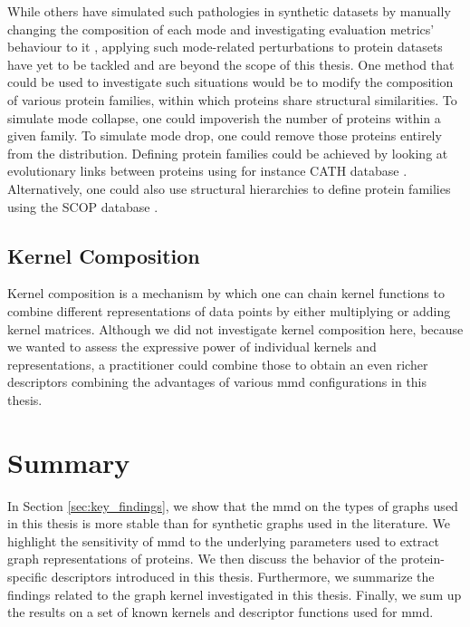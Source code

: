 While others have simulated such pathologies in synthetic datasets by manually
changing the composition of each mode and investigating evaluation metrics'
behaviour to it \citep{thompson2022evaluation}, applying such mode-related
perturbations to protein datasets have yet to be tackled and are beyond the
scope of this thesis. One method that could be used to investigate such
situations would be to modify the composition of various protein families,
within which proteins share structural similarities. To simulate mode collapse,
one could impoverish the number of proteins within a given family. To simulate
mode drop, one could remove those proteins entirely from the distribution.
Defining protein families could be achieved by looking at evolutionary links
between proteins using for instance CATH database \citep{orengo1997cath}.
Alternatively, one could also use structural hierarchies to define protein
families using the SCOP database \citep{murzin1995scop}.

\subsection{Kernel Composition}

Kernel composition is a mechanism by which one can chain kernel functions to
combine different representations of data points by either multiplying or adding
kernel matrices. Although we did not investigate kernel composition here,
because we wanted to assess the expressive power of individual kernels and
representations, a practitioner could combine those to obtain an even richer
descriptors combining the advantages of various \acrshort{mmd} configurations in this
thesis.

\section{Summary}


In Section \ref{sec:key_findings}, we show that the \acrshort{mmd} on the types of graphs used in this
thesis is more stable than for synthetic graphs used in the literature. We
highlight the sensitivity of \acrshort{mmd} to the underlying parameters used to extract
graph representations of proteins. We then discuss the behavior of the
protein-specific descriptors introduced in this thesis. Furthermore, we
summarize the findings related to the graph kernel investigated in this thesis.
Finally, we sum up the results on a set of known kernels and descriptor
functions used for \acrshort{mmd}.


